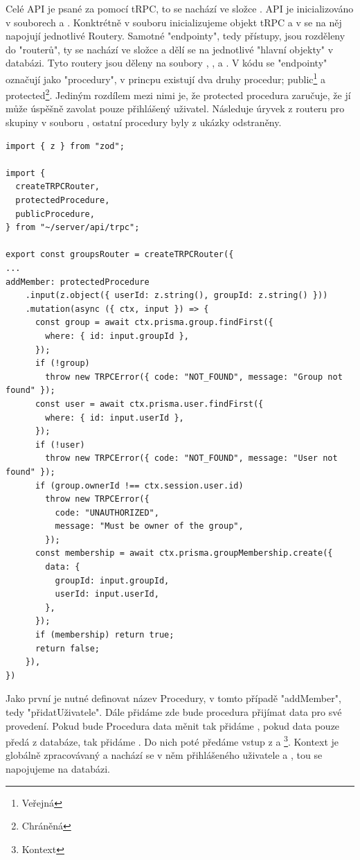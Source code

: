 Celé API je psané za pomocí tRPC, to se nachází ve složce .
API je inicializováno v souborech  a . Konktrétně v souboru  inicializujeme objekt tRPC a v  se na něj napojují jednotlivé Routery. Samotné "endpointy", tedy přístupy, jsou rozděleny do "routerů", ty se nachází ve složce  a dělí se na jednotlivé "hlavní objekty" v databázi. Tyto routery jsou děleny na soubory , ,  a . V kódu se "endpointy" označují jako "procedury", v princpu existují dva druhy procedur; public\footnote{Veřejná} a protected\footnote{Chráněná}. Jediným rozdílem mezi nimi je, že protected procedura zaručuje, že jí může úspěšně zavolat pouze přihlášený uživatel.
Následuje úryvek z routeru pro skupiny v souboru , ostatní procedury byly z ukázky odstraněny.
\begin{lstlisting}[caption={Procedura na přidání uživatele do skupiny}]
import { z } from "zod";

import {
  createTRPCRouter,
  protectedProcedure,
  publicProcedure,
} from "~/server/api/trpc";

export const groupsRouter = createTRPCRouter({
...
addMember: protectedProcedure
    .input(z.object({ userId: z.string(), groupId: z.string() }))
    .mutation(async ({ ctx, input }) => {
      const group = await ctx.prisma.group.findFirst({
        where: { id: input.groupId },
      });
      if (!group)
        throw new TRPCError({ code: "NOT_FOUND", message: "Group not found" });
      const user = await ctx.prisma.user.findFirst({
        where: { id: input.userId },
      });
      if (!user)
        throw new TRPCError({ code: "NOT_FOUND", message: "User not found" });
      if (group.ownerId !== ctx.session.user.id)
        throw new TRPCError({
          code: "UNAUTHORIZED",
          message: "Must be owner of the group",
        });
      const membership = await ctx.prisma.groupMembership.create({
        data: {
          groupId: input.groupId,
          userId: input.userId,
        },
      });
      if (membership) return true;
      return false;
    }),
})
\end{lstlisting}
Jako první je nutné definovat název Procedury, v tomto případě "addMember", tedy "přidatUživatele". Dále přidáme  zde bude procedura přijímat data pro své provedení. Pokud bude Procedura data měnit tak přidáme , pokud data pouze předá z databáze, tak přidáme . Do nich poté předáme vstup z  a \footnote{Kontext}. Kontext je globálně zpracovávaný a nachází se v něm  přihlášeného uživatele a , tou se napojujeme na databázi.
\newpage
